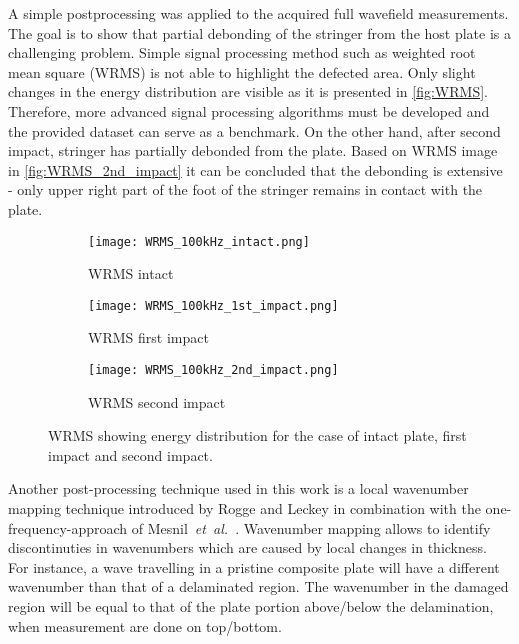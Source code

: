 \documentclass[times,final]{elsarticle}
\begin{document}
A simple postprocessing was applied to the acquired full wavefield measurements.
The goal is to show that partial debonding of the stringer from the host plate is a challenging problem.
Simple signal processing method such as weighted root mean square (WRMS)\cite{Radzienski2011} is not able to highlight the defected area. Only slight changes in the energy distribution are visible as it is presented in \autoref{fig:WRMS}.
Therefore, more advanced signal processing algorithms must be developed and the provided dataset can serve as a benchmark.
On the other hand, after second impact, stringer has partially debonded from the plate. Based on WRMS image in \autoref{fig:WRMS_2nd_impact} it can be concluded that the debonding is extensive - only upper right part of the foot of the stringer remains in contact with the plate. 
\begin{figure} [h!]
	\centering
	\begin{subfigure}[b]{0.49\textwidth}
		\texttt{[image: WRMS\_100kHz\_intact.png]}
		\caption{WRMS intact}
		\label{fig:WRMS_intact}
	\end{subfigure}
	\begin{subfigure}[b]{0.49\textwidth}
		\texttt{[image: WRMS\_100kHz\_1st\_impact.png]}
		\caption{WRMS first impact}
		\label{fig:WRMS_1st_impact}
	\end{subfigure}
	\begin{subfigure}[b]{0.49\textwidth}
		\texttt{[image: WRMS\_100kHz\_2nd\_impact.png]}
		\caption{WRMS second impact}
		\label{fig:WRMS_2nd_impact}
	\end{subfigure}
	\caption{WRMS showing energy distribution for the case of intact plate, first impact and second impact.}
	\label{fig:WRMS}
\end{figure}

Another post-processing technique used in this work is a local wavenumber mapping technique introduced by Rogge and Leckey \cite{ROGGE2013} in combination with the one-frequency-approach of Mesnil~\textit{et~al.}~\cite{MESNIL2015}. Wavenumber mapping allows to identify discontinuties in wavenumbers which are caused by local changes in thickness. For instance, a wave travelling in a pristine composite plate will have a different wavenumber than that of a delaminated region. The wavenumber in the damaged region will be equal to that of the plate portion above/below the delamination, when measurement are done on top/bottom. 
\end{document}
